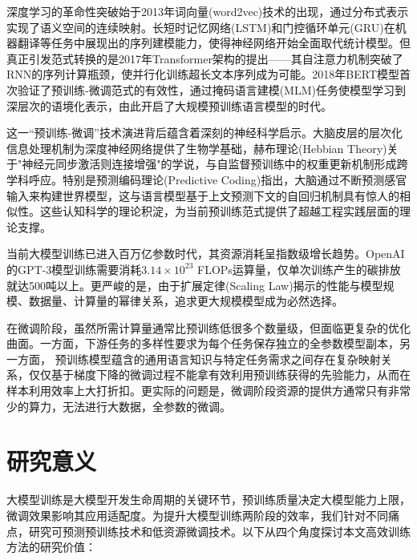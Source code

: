 深度学习的革命性突破始于2013年词向量(word2vec)技术的出现，通过分布式表示实现了语义空间的连续映射。长短时记忆网络(LSTM)和门控循环单元(GRU)在机器翻译等任务中展现出的序列建模能力，使得神经网络开始全面取代统计模型。但真正引发范式转换的是2017年Transformer架构的提出——其自注意力机制突破了RNN的序列计算瓶颈，使并行化训练超长文本序列成为可能。2018年BERT模型首次验证了预训练-微调范式的有效性，通过掩码语言建模(MLM)任务使模型学习到深层次的语境化表示，由此开启了大规模预训练语言模型的时代。

这一“预训练-微调”技术演进背后蕴含着深刻的神经科学启示。大脑皮层的层次化信息处理机制为深度神经网络提供了生物学基础，赫布理论(Hebbian Theory)关于"神经元同步激活则连接增强"的学说，与自监督预训练中的权重更新机制形成跨学科呼应。特别是预测编码理论(Predictive Coding)指出，大脑通过不断预测感官输入来构建世界模型，这与语言模型基于上文预测下文的自回归机制具有惊人的相似性。这些认知科学的理论积淀，为当前预训练范式提供了超越工程实践层面的理论支撑。

当前大模型训练已进入百万亿参数时代，其资源消耗呈指数级增长趋势。OpenAI的GPT-3模型训练需要消耗$3.14\times 10^{23}$ FLOPs运算量，仅单次训练产生的碳排放就达500吨以上。更严峻的是，由于扩展定律(Scaling Law)揭示的性能与模型规模、数据量、计算量的幂律关系，追求更大规模模型成为必然选择。

在微调阶段，虽然所需计算量通常比预训练低很多个数量级，但面临更复杂的优化曲面。一方面，下游任务的多样性要求为每个任务保存独立的全参数模型副本，另一方面， 预训练模型蕴含的通用语言知识与特定任务需求之间存在复杂映射关系，仅仅基于梯度下降的微调过程不能拿有效利用预训练获得的先验能力，从而在样本利用效率上大打折扣。更实际的问题是，微调阶段资源的提供方通常只有非常少的算力，无法进行大数据，全参数的微调。



\section{研究意义}
大模型训练是大模型开发生命周期的关键环节，预训练质量决定大模型能力上限，微调效果影响其应用适配度。为提升大模型训练两阶段的效率，我们针对不同痛点，研究可预测预训练技术和低资源微调技术。以下从四个角度探讨本文高效训练方法的研究价值：

